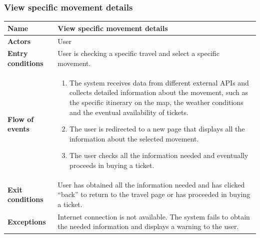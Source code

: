 \subsubsection{View specific movement details}
\begin{table}[!h]
	\centering
	{\renewcommand{\arraystretch}{2}%
		\begin{tabular}{|l|p{12cm}|}
			\hline
			\textbf{Name} 				& \textbf{View specific movement details} \\ \hline
			\textbf{Actors} 			& User \\ \hline
			\textbf{Entry conditions} 	& User is checking a specific travel and select a specific movement. \\ \hline
			\textbf{Flow of events}		& \begin{minipage}[t]{0.75\textwidth}
				\begin{enumerate}
					\item The system receives data from different external APIs and collects detailed information about the movement, such as the specific itinerary on the map, the weather conditions and the eventual availability of tickets.
					\item The user is redirected to a new page that displays all the information about the selected movement.
					\item The user checks all the information needed and eventually proceeds in buying a ticket.
				\end{enumerate}
			\end{minipage}	\\ \hline
			\textbf{Exit conditions}	& User has obtained all the information needed and has clicked “back” to return to the travel page or has proceeded in buying a ticket.  \\ \hline
			\textbf{Exceptions}			& Internet connection is not available. The system fails to obtain the needed information and displays a warning to the user.  \\ \hline
	\end{tabular}}
\end{table}

